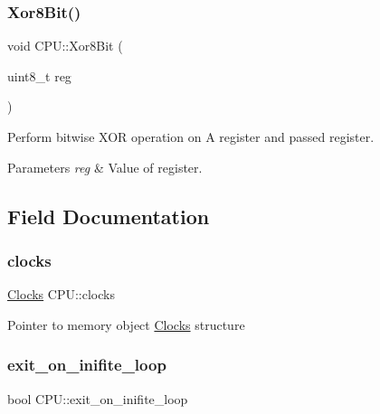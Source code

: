 \subsubsection{\texorpdfstring{Xor8\+Bit()}{Xor8Bit()}}
{\footnotesize\ttfamily void C\+P\+U\+::\+Xor8\+Bit (\begin{DoxyParamCaption}\item[{uint8\+\_\+t}]{reg }\end{DoxyParamCaption})\hspace{0.3cm}{\ttfamily [private]}}



Perform bitwise X\+OR operation on A register and passed register. 


\begin{DoxyParams}{Parameters}
{\em reg} & Value of register. \\
\hline
\end{DoxyParams}


\subsection{Field Documentation}
\mbox{\label{classCPU_a03bd87cbd5f51d81adb540a6f478de4a}} 
\subsubsection{\texorpdfstring{clocks}{clocks}}
{\footnotesize\ttfamily \mbox{\hyperlink{structClocks}{Clocks}} C\+P\+U\+::clocks\hspace{0.3cm}{\ttfamily [private]}}

Pointer to memory object \mbox{\hyperlink{structClocks}{Clocks}} structure \mbox{\label{classCPU_a16be551906c5f6c501348ec25e57d7b4}} 
\subsubsection{\texorpdfstring{exit\+\_\+on\+\_\+inifite\+\_\+loop}{exit\_on\_inifite\_loop}}
{\footnotesize\ttfamily bool C\+P\+U\+::exit\+\_\+on\+\_\+inifite\+\_\+loop\hspace{0.3cm}{\ttfamily [private]}}

